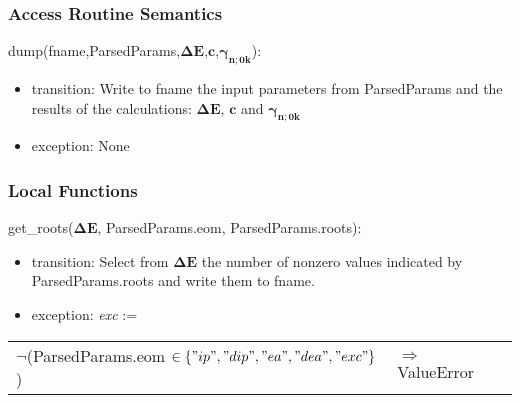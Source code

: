\documentclass[12pt, titlepage]{article}
\begin{document}

\subsubsection{Access Routine Semantics}

\noindent dump(fname,ParsedParams,$\boldsymbol{\Delta 
E}$,$\boldsymbol{c}$,$\boldsymbol{\gamma_{n;0k}}$):
\begin{itemize}
	\item transition: Write to fname the input parameters from ParsedParams and 
	the results of the calculations: $\boldsymbol{\Delta 
		E}$, $\boldsymbol{c}$ and $\boldsymbol{\gamma_{n;0k}}$
	\item exception: None
\end{itemize}

%

\subsubsection{Local Functions}

\noindent get\_roots($\boldsymbol{\Delta E}$, ParsedParams.eom, 
ParsedParams.roots):
\begin{itemize}
	\item transition: Select from $\boldsymbol{\Delta E}$ the number of nonzero 
	values indicated by ParsedParams.roots and write them to fname.
	\item exception: \textit{exc} :=  
\end{itemize}
\noindent \begin{longtable*}[l]{l l}
$\neg$(ParsedParams.eom $\in \{"ip", "dip", "ea", "dea", "exc"\}$)  & 
$\Rightarrow$ ValueError
\end{longtable*} 
\end{document}
